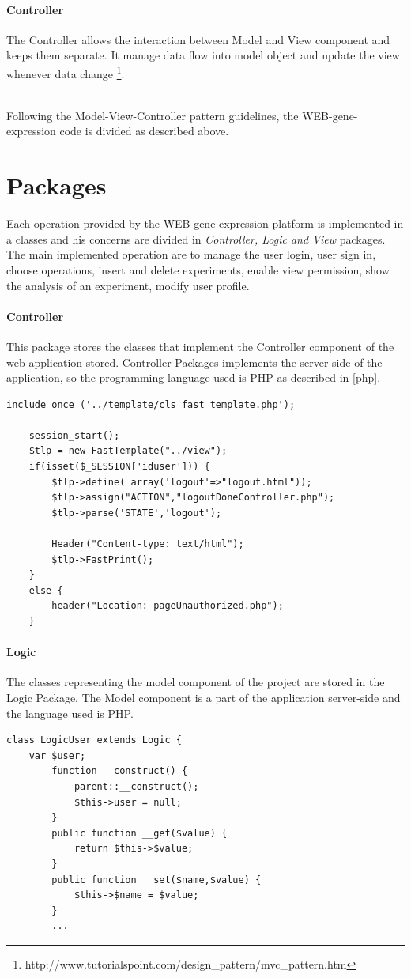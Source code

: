 \documentclass[a4paper]{report}
\begin{document}
  \paragraph{Controller} The Controller allows the interaction between Model and View component and keeps them separate. It manage data flow into model object and update the view whenever data change \footnote{http://www.tutorialspoint.com/design\_pattern/mvc\_pattern.htm}.  

\
\\Following the Model-View-Controller pattern guidelines, the WEB-gene-expression code is divided as described above.

\section{Packages}

Each operation provided by the WEB-gene-expression platform is implemented in a classes and his concerns are divided in \emph{Controller, Logic and View} packages. 
The main implemented operation are to manage the user login, user sign in, choose operations, insert and delete experiments, enable view permission, show the analysis of an experiment, modify user profile.

\paragraph{Controller} This package stores the classes that implement the Controller component of the web application stored. Controller Packages implements the server side of the application, so the programming language used is PHP as described in \ref{php}.
\begin{lstlisting}[title={example of logoutController.php},frame=trBL]
include_once ('../template/cls_fast_template.php');
	
	session_start();
	$tlp = new FastTemplate("../view");
	if(isset($_SESSION['iduser'])) {
		$tlp->define( array('logout'=>"logout.html"));
		$tlp->assign("ACTION","logoutDoneController.php");
		$tlp->parse('STATE','logout');
	
		Header("Content-type: text/html");
		$tlp->FastPrint();
	}
	else {
		header("Location: pageUnauthorized.php");
	}
\end{lstlisting}



\paragraph{Logic} The classes representing the model component of the project are stored in the Logic Package. The Model component is a part of the application server-side and the language used is PHP.
\begin{lstlisting}[title={Fragment of logicUser.php},frame=trBL]	
class LogicUser extends Logic {
	var $user;
		function __construct() {
			parent::__construct();
			$this->user = null;	
		}
		public function __get($value) {
			return $this->$value;
		}
		public function __set($name,$value) {
			$this->$name = $value;
		}	
		...
\end{lstlisting}
\end{document}
